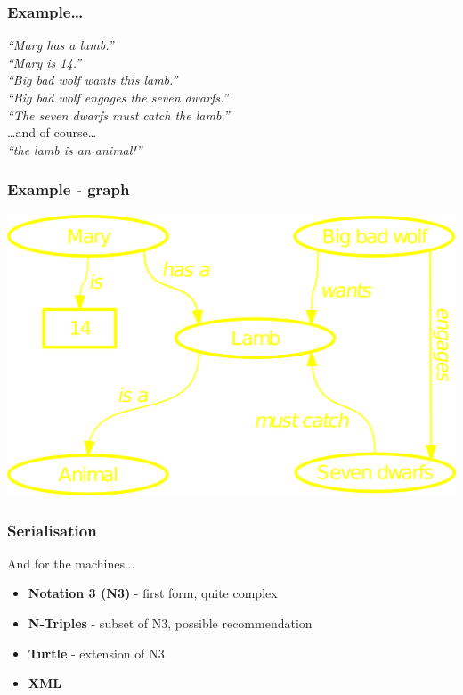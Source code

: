 \documentclass[handout]{beamer}
\begin{document}
        \begin{frame}
            \frametitle{Example\ldots}
            \textit{``Mary has a lamb.''\\
            \pause
            \textit{``Mary is 14.''}\\
            \pause
            ``Big bad wolf wants this lamb.''\\
            \pause
            ``Big bad wolf engages the seven dwarfs.''\\
            \pause
            ``The seven dwarfs must catch the lamb.''\\}
            \pause
            \ldots and of course\ldots\\
            \pause
            \textit{``the lamb is an animal!''}
            \pause
        \end{frame}

        \begin{frame}
            \frametitle{Example - graph}

            \includegraphics[scale=0.7]{graph}
        \end{frame}

        \begin{frame}
            \frametitle{Serialisation}
    
            And for the machines...
            \vskip 0.7cm
            \begin{itemize}
                \item \textbf{Notation 3 (N3)} - first form, quite complex
                \pause
                \item \textbf{N-Triples} - subset of N3, possible recommendation
                \pause
                \item \textbf{Turtle} - extension of N3
                \pause
                \item \textbf{XML}
                \pause
           \end{itemize}
           \vskip 0.7cm
       \end{frame}
\end{document}
